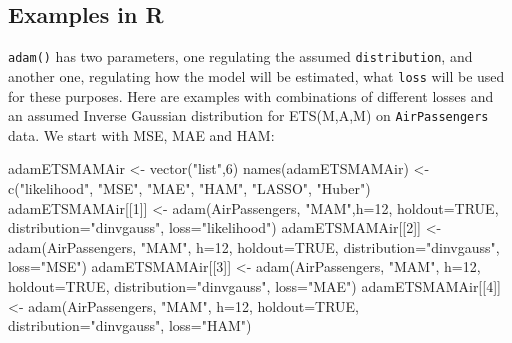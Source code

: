 \documentclass[
]{book}
\newenvironment{Shaded}{\begin{snugshade}}{\end{snugshade}}
\newcommand{\AttributeTok}[1]{\textcolor[rgb]{0.77,0.63,0.00}{#1}}
\newcommand{\ConstantTok}[1]{\textcolor[rgb]{0.00,0.00,0.00}{#1}}
\newcommand{\DecValTok}[1]{\textcolor[rgb]{0.00,0.00,0.81}{#1}}
\newcommand{\FunctionTok}[1]{\textcolor[rgb]{0.00,0.00,0.00}{#1}}
\newcommand{\NormalTok}[1]{#1}
\newcommand{\OtherTok}[1]{\textcolor[rgb]{0.56,0.35,0.01}{#1}}
\newcommand{\StringTok}[1]{\textcolor[rgb]{0.31,0.60,0.02}{#1}}
\theoremstyle{definition}
\theoremstyle{definition}
\theoremstyle{definition}
\theoremstyle{definition}
\theoremstyle{remark}
\begin{document}
\hypertarget{examples-in-r}{%
\subsection{Examples in R}\label{examples-in-r}}

\texttt{adam()} has two parameters, one regulating the assumed \texttt{distribution}, and another one, regulating how the model will be estimated, what \texttt{loss} will be used for these purposes. Here are examples with combinations of different losses and an assumed Inverse Gaussian distribution for ETS(M,A,M) on \texttt{AirPassengers} data. We start with MSE, MAE and HAM:

\begin{Shaded}
\begin{Highlighting}[]
\NormalTok{adamETSMAMAir }\OtherTok{\textless{}{-}} \FunctionTok{vector}\NormalTok{(}\StringTok{"list"}\NormalTok{,}\DecValTok{6}\NormalTok{)}
\FunctionTok{names}\NormalTok{(adamETSMAMAir) }\OtherTok{\textless{}{-}}
    \FunctionTok{c}\NormalTok{(}\StringTok{"likelihood"}\NormalTok{, }\StringTok{"MSE"}\NormalTok{, }\StringTok{"MAE"}\NormalTok{, }\StringTok{"HAM"}\NormalTok{, }\StringTok{"LASSO"}\NormalTok{, }\StringTok{"Huber"}\NormalTok{)}
\NormalTok{adamETSMAMAir[[}\DecValTok{1}\NormalTok{]] }\OtherTok{\textless{}{-}} \FunctionTok{adam}\NormalTok{(AirPassengers, }\StringTok{"MAM"}\NormalTok{,}\AttributeTok{h=}\DecValTok{12}\NormalTok{, }\AttributeTok{holdout=}\ConstantTok{TRUE}\NormalTok{,}
                           \AttributeTok{distribution=}\StringTok{"dinvgauss"}\NormalTok{,}
                           \AttributeTok{loss=}\StringTok{"likelihood"}\NormalTok{)}
\NormalTok{adamETSMAMAir[[}\DecValTok{2}\NormalTok{]] }\OtherTok{\textless{}{-}} \FunctionTok{adam}\NormalTok{(AirPassengers, }\StringTok{"MAM"}\NormalTok{, }\AttributeTok{h=}\DecValTok{12}\NormalTok{, }\AttributeTok{holdout=}\ConstantTok{TRUE}\NormalTok{,}
                           \AttributeTok{distribution=}\StringTok{"dinvgauss"}\NormalTok{,}
                           \AttributeTok{loss=}\StringTok{"MSE"}\NormalTok{)}
\NormalTok{adamETSMAMAir[[}\DecValTok{3}\NormalTok{]] }\OtherTok{\textless{}{-}} \FunctionTok{adam}\NormalTok{(AirPassengers, }\StringTok{"MAM"}\NormalTok{, }\AttributeTok{h=}\DecValTok{12}\NormalTok{, }\AttributeTok{holdout=}\ConstantTok{TRUE}\NormalTok{,}
                           \AttributeTok{distribution=}\StringTok{"dinvgauss"}\NormalTok{,}
                           \AttributeTok{loss=}\StringTok{"MAE"}\NormalTok{)}
\NormalTok{adamETSMAMAir[[}\DecValTok{4}\NormalTok{]] }\OtherTok{\textless{}{-}} \FunctionTok{adam}\NormalTok{(AirPassengers, }\StringTok{"MAM"}\NormalTok{, }\AttributeTok{h=}\DecValTok{12}\NormalTok{, }\AttributeTok{holdout=}\ConstantTok{TRUE}\NormalTok{,}
                           \AttributeTok{distribution=}\StringTok{"dinvgauss"}\NormalTok{,}
                           \AttributeTok{loss=}\StringTok{"HAM"}\NormalTok{)}
\end{Highlighting}
\end{Shaded}
\end{document}
